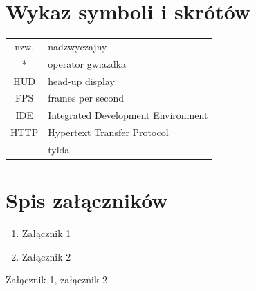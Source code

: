 \documentclass[a4paper,11pt,twoside]{report}
\theoremstyle{definition}
\begin{document}
\chapter*{Wykaz symboli i skrótów}

\begin{tabular}{cl}
nzw. & nadzwyczajny \\
* & operator gwiazdka \\
HUD & head-up display \\
FPS & frames per second \\
IDE & Integrated Development Environment \\
HTTP & Hypertext Transfer Protocol \\
$\widetilde{}$ & tylda
\end{tabular}
\thispagestyle{empty}


\listoffigures
\thispagestyle{empty}


\renewcommand{\listtablename}{Spis tabel}
\listoftables
\thispagestyle{empty}




\chapter*{Spis załączników}
\begin{enumerate}[itemsep = 0pt]
\item Załącznik 1
\item Załącznik 2
\end{enumerate}
\thispagestyle{empty}


\newpage
\pagestyle{empty} 
Załącznik 1, załącznik 2
\end{document}
